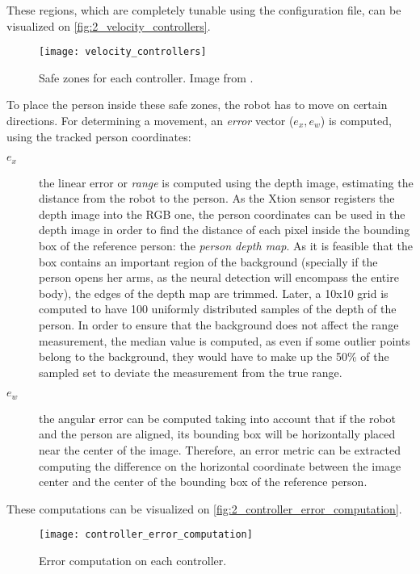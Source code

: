 These regions, which are completely tunable using the configuration file, can be visualized on \autoref{fig:2_velocity_controllers}.

\begin{figure}[h]
	\centering
	\texttt{[image: velocity\_controllers]}
	\caption{Safe zones for each controller. Image from \cite{tfg}.}
	\label{fig:2_velocity_controllers}
\end{figure}

To place the person inside these safe zones, the robot has to move on certain directions. For determining a movement, an \textit{error} vector ($e_x, e_w$) is computed, using the tracked person coordinates:

\begin{description}
	\item[$e_x$] the linear error or \textit{range} is computed using the depth image, estimating the distance from the robot to the person. As the Xtion sensor registers the depth image into the RGB one, the person coordinates can be used in the depth image in order to find the distance of each pixel inside the bounding box of the reference person: the \textit{person depth map}. As it is feasible that the box contains an important region of the background (specially if the person opens her arms, as the neural detection will encompass the entire body), the edges of the depth map are trimmed. Later, a 10x10 grid is computed to have 100 uniformly distributed samples of the depth of the person. In order to ensure that the background does not affect the range measurement, the median value is computed, as even if some outlier points belong to the background, they would have to make up the 50\% of the sampled set to deviate the measurement from the true range.
	
	\item[$e_w$] the angular error can be computed taking into account that if the robot and the person are aligned, its bounding box will be horizontally placed near the center of the image. Therefore, an error metric can be extracted computing the difference on the horizontal coordinate between the image center and the center of the bounding box of the reference person.
\end{description}

These computations can be visualized on \autoref{fig:2_controller_error_computation}.


\begin{figure}[h]
	\centering
	\texttt{[image: controller\_error\_computation]}
	\caption{Error computation on each controller.}
	\label{fig:2_controller_error_computation}
\end{figure}

